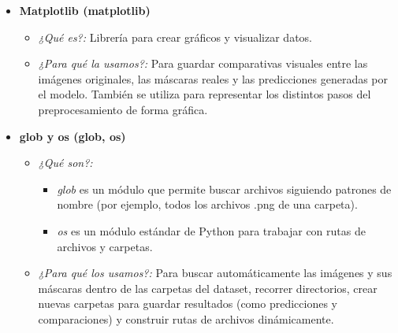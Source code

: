 \documentclass[12pt]{article}
\begin{document}
\begin{itemize}
    \item \textbf{Matplotlib (matplotlib)} \cite{matplotlib}
    \begin{itemize}
        \item \textit{¿Qué es?:} Librería para crear gráficos y visualizar datos.
        \item \textit{¿Para qué la usamos?:} Para guardar comparativas visuales entre las imágenes originales, las máscaras reales y las predicciones generadas por el modelo. También se utiliza para representar los distintos pasos del preprocesamiento de forma gráfica.
    \end{itemize}

    \item \textbf{glob y os (glob, os)} \cite{glob}
    \cite{os}
    \begin{itemize}
        \item \textit{¿Qué son?:}
        \begin{itemize}
            \item \textit{glob} es un módulo que permite buscar archivos siguiendo patrones de nombre (por ejemplo, todos los archivos .png de una carpeta).
            \item \textit{os} es un módulo estándar de Python para trabajar con rutas de archivos y carpetas.
        \end{itemize}
        \item \textit{¿Para qué los usamos?:} Para buscar automáticamente las imágenes y sus máscaras dentro de las carpetas del dataset, recorrer directorios, crear nuevas carpetas para guardar resultados (como predicciones y comparaciones) y construir rutas de archivos dinámicamente.
    \end{itemize}


\end{itemize}
\end{document}
